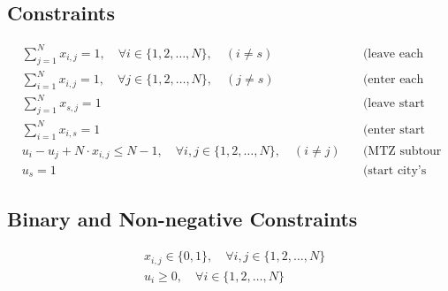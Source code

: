 \documentclass{article}
\begin{document}
\subsection*{Constraints}
\begin{align}
    & \sum_{j=1}^{N} x_{i,j} = 1, \quad \forall i \in \{1, 2, \ldots, N\}, \quad (i \neq s) \quad &\text{(leave each city)} \\
    & \sum_{i=1}^{N} x_{i,j} = 1, \quad \forall j \in \{1, 2, \ldots, N\}, \quad (j \neq s) \quad &\text{(enter each city)} \\
    & \sum_{j=1}^{N} x_{s,j} = 1 \quad &\text{(leave start city)} \\
    & \sum_{i=1}^{N} x_{i,s} = 1 \quad &\text{(enter start city)} \\
    & u_i - u_j + N \cdot x_{i,j} \leq N-1, \quad \forall i, j \in \{1, 2, \ldots, N\}, \quad (i \neq j) \quad &\text{(MTZ subtour elimination)} \\
    & u_s = 1 \quad &\text{(start city's position in tour)}
\end{align}

\subsection*{Binary and Non-negative Constraints}
\begin{align}
    & x_{i,j} \in \{0, 1\}, \quad \forall i, j \in \{1, 2, \ldots, N\} \\
    & u_i \geq 0, \quad \forall i \in \{1, 2, \ldots, N\}
\end{align}
\end{document}
